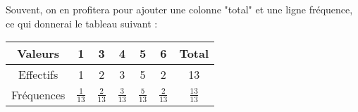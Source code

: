 Souvent, on en profitera pour ajouter une colonne "total" et une ligne fréquence, ce qui donnerai le tableau suivant :

\begin{center}
    \begin{tabular}{c*{6}{|c}}
        Valeurs & 1 & 3 & 4 &5 & 6 & Total \\ \hline
        Effectifs & 1 & 2 & 3 & 5 & 2 & 13\\ \hline
        Fréquences &$\frac{1}{13}$ & $\frac{2}{13}$  & $\frac{3}{13}$  & $\frac{5}{13}$  & $\frac{2}{13}$  & $\frac{13}{13}$ 
    \end{tabular}
\end{center}